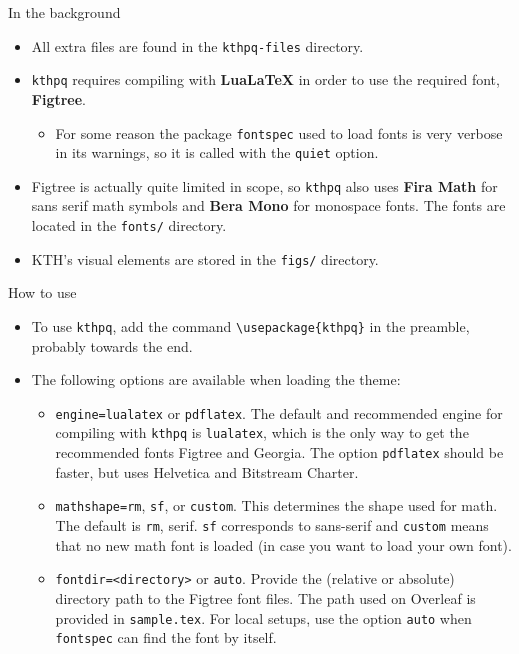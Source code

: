 \documentclass[17pt, t, lualatex]{beamer}
\renewcommand*{\emph}[1]{{\color{digital blue} \bfseries #1}}
\def\kthpq{\texttt{kthpq}}
\begin{document}
\begin{frame}{In the background}
\begin{itemize}
\item All extra files are found in the \texttt{kthpq-files} directory.
\item \kthpq{} requires compiling with \emph{LuaLaTeX} in order to use the required font, \emph{Figtree}.
\begin{itemize}
\item For some reason the package \texttt{fontspec} used to load fonts is very verbose in its warnings, so it is called with the \texttt{quiet} option.
\end{itemize}
\item Figtree is actually quite limited in scope, so \kthpq{} also uses \emph{Fira Math} for sans serif math symbols and \emph{Bera Mono} for monospace fonts. The fonts are located in the \texttt{fonts/} directory.
\item KTH's visual elements are stored in the \texttt{figs/} directory.
\end{itemize}
\end{frame}

\begin{frame}[fragile=singleslide]{How to use}
\begin{itemize}
\item To use \kthpq{}, add the command \verb|\usepackage{kthpq}| in the preamble, probably towards the end.
\item The following options are available when loading the theme:
\begin{itemize}
\item \texttt{engine=lualatex} or \texttt{pdflatex}. The default and recommended engine for compiling with \kthpq{} is \texttt{lualatex}, which is the only way to get the recommended fonts Figtree and Georgia. The option \texttt{pdflatex} should be faster, but uses Helvetica and Bitstream Charter.
\item \texttt{mathshape=rm}, \texttt{sf}, or \texttt{custom}. This determines the shape used for math. The default is \texttt{rm}, serif. \texttt{sf} corresponds to sans-serif and \texttt{custom} means that no new math font is loaded (in case you want to load your own font).
\item \texttt{fontdir=\textless directory\textgreater} or \texttt{auto}. Provide the (relative or absolute) directory path to the Figtree font files. The path used on Overleaf is provided in \texttt{sample.tex}. For local setups, use the option \texttt{auto} when \texttt{fontspec} can find the font by itself.
\end{itemize}
\end{itemize}
\end{frame}
\end{document}
